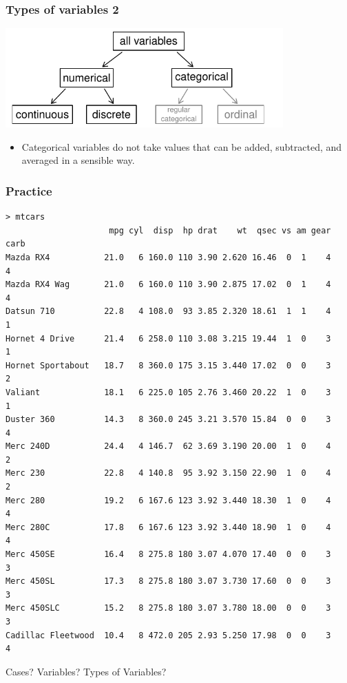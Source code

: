\begin{frame}
\frametitle{Types of variables 2}

\begin{center}
\includegraphics[width=0.8\textwidth]{1-2_data_basics/figures/variables/variables}
\end{center}
\begin{itemize}
\item Categorical variables do not take values that can be added, subtracted, and averaged in a sensible way.
\end{itemize}
\end{frame}



\begin{frame}[fragile]
\frametitle{Practice}
{\scriptsize
\begin{verbatim}
> mtcars
                     mpg cyl  disp  hp drat    wt  qsec vs am gear carb
Mazda RX4           21.0   6 160.0 110 3.90 2.620 16.46  0  1    4    4
Mazda RX4 Wag       21.0   6 160.0 110 3.90 2.875 17.02  0  1    4    4
Datsun 710          22.8   4 108.0  93 3.85 2.320 18.61  1  1    4    1
Hornet 4 Drive      21.4   6 258.0 110 3.08 3.215 19.44  1  0    3    1
Hornet Sportabout   18.7   8 360.0 175 3.15 3.440 17.02  0  0    3    2
Valiant             18.1   6 225.0 105 2.76 3.460 20.22  1  0    3    1
Duster 360          14.3   8 360.0 245 3.21 3.570 15.84  0  0    3    4
Merc 240D           24.4   4 146.7  62 3.69 3.190 20.00  1  0    4    2
Merc 230            22.8   4 140.8  95 3.92 3.150 22.90  1  0    4    2
Merc 280            19.2   6 167.6 123 3.92 3.440 18.30  1  0    4    4
Merc 280C           17.8   6 167.6 123 3.92 3.440 18.90  1  0    4    4
Merc 450SE          16.4   8 275.8 180 3.07 4.070 17.40  0  0    3    3
Merc 450SL          17.3   8 275.8 180 3.07 3.730 17.60  0  0    3    3
Merc 450SLC         15.2   8 275.8 180 3.07 3.780 18.00  0  0    3    3
Cadillac Fleetwood  10.4   8 472.0 205 2.93 5.250 17.98  0  0    3    4
\end{verbatim}}
Cases? Variables? Types of Variables?

\end{frame}


